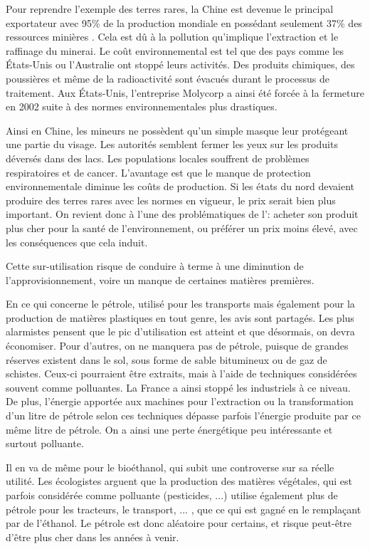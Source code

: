 Pour reprendre l'exemple des terres rares, la Chine est devenue le principal exportateur avec 95\% de la production mondiale en possédant seulement 37\% des ressources minières \cite{MongolieChine}. Cela est dû à la pollution qu'implique l'extraction et le raffinage du minerai. Le coût environnemental est tel que des pays comme les États-Unis ou l'Australie ont stoppé leurs activités. Des produits chimiques, des poussières et même de la radioactivité sont évacués durant le processus de traitement. Aux États-Unis, l'entreprise Molycorp a ainsi été forcée à la fermeture en 2002 suite à des normes environnementales plus drastiques.

Ainsi en Chine, les mineurs ne possèdent qu'un simple masque leur protégeant une partie du visage. Les autorités semblent fermer les yeux sur les produits déversés dans des lacs. Les populations locales souffrent de problèmes respiratoires et de cancer. L'avantage est que le manque de protection environnementale diminue les coûts de production. Si les états du nord devaient produire des terres rares avec les normes en vigueur, le prix serait bien plus important. On revient donc à l'une des problématiques de l'\op : acheter son produit plus cher pour la santé de l'environnement, ou préférer un prix moins élevé, avec les conséquences que cela induit.


\medbreak Cette sur-utilisation risque de conduire à terme à une diminution de l'approvisionnement, voire un manque de certaines matières premières.

En ce qui concerne le pétrole, utilisé pour les transports mais également pour la production de matières plastiques en tout genre, les avis sont partagés. Les plus alarmistes pensent que le pic d'utilisation est atteint et que désormais, on devra économiser. Pour d'autres, on ne manquera pas de pétrole, puisque de grandes réserves existent dans le sol, sous forme de sable bitumineux ou de gaz de schistes. Ceux-ci pourraient être extraits, mais à l'aide de techniques considérées souvent comme polluantes. La France a ainsi stoppé les industriels à ce niveau. De plus, l'énergie apportée aux machines pour l'extraction ou la transformation d'un litre de pétrole selon ces techniques dépasse parfois l’énergie produite par ce même litre de pétrole. On a ainsi une perte énergétique peu intéressante et surtout polluante.

Il en va de même pour le bioéthanol, qui subit une controverse sur sa réelle utilité. Les écologistes arguent que la production des matières végétales, qui est parfois considérée comme polluante (pesticides, ...) utilise également plus de pétrole pour les tracteurs, le transport, ... , que ce qui est gagné en le remplaçant par de l’éthanol. Le pétrole est donc aléatoire pour certains, et risque peut-être d'être plus cher dans les années à venir.


